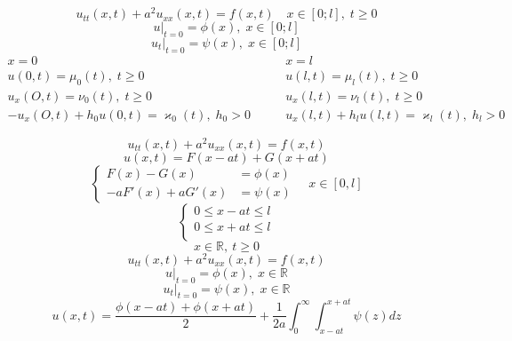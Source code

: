 \documentclass[a4paper]{article}
\begin{document}
\begin{equation}
    u_{t t}(x,t) + a^2 u_{xx}(x,t) = f(x,t) \quad x \in [0;l], \; t \geq 0
\end{equation}
\begin{equation}
    u |_{t=0} = \phi(x), \; x \in [0;l] 
\end{equation}
\begin{equation}
    u_t |_{t=0} = \psi(x), \; x \in [0;l] 
\end{equation}
\begin{subequations}
\begin{align}
    x = 0 &\qquad x = l\\
    u(0,t) = \mu_0(t),\; t \geq 0 &\qquad u(l,t) = \mu_l(t), \; t \geq 0\\
    u_x(O,t) = \nu_0(t), \; t \geq 0 &\qquad u_x(l,t) = \nu_l(t), \; t \geq 0\\
    -u_x(O,t) + h_0 u(0,t) = \varkappa_0(t), \; h_0 > 0 &\qquad u_x (l,t) + h_l u(l,t) 
    = \varkappa_l(t), \; h_l > 0
\end{align}
\end{subequations}

\[
    u_{t t}(x,t) + a^2 u_{xx}(x,t) = f(x,t)
\]
\[
    u(x,t) = F(x-at) + G(x+at)
\]
\[
    \begin{cases}
        F(x) - G(x) &= \phi(x)\\
        -aF'(x) + aG'(x) &= \psi(x)
    \end{cases}
    \quad x \in [0,l]
\]
\[
    \begin{cases}
        0 \leq x -at \leq l\\
        0 \leq x +at \leq l\\
    \end{cases}
\]
\[
    x \in \mathbb{R}, \ t \geq 0
\]
\[
    u_{t t}(x,t) + a^2 u_{xx}(x,t) = f(x,t)
\]
\[
    u |_{t=0} = \phi(x), \; x \in \mathbb{R}
\]
\[
    u_t |_{t=0} = \psi(x), \; x \in \mathbb{R}
\]
\[
    u(x,t) = \frac{\phi(x - at) + \phi(x+at)}{2} + \frac{1}{2a}\int_{0}^{\infty}  
    \int_{x-at}^{x+at} \psi(z) dz
\]
\end{document}
